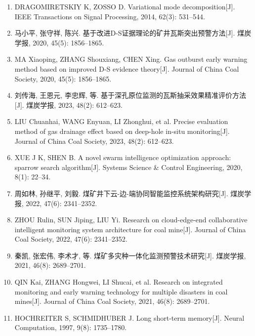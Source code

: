 \documentclass[twocolumn,a4paper]{ctexart}
\numberwithin{equation}{section}
\begin{document}
\begin{flushleft}
\songti
\begin{enumerate}
\item[{[1]}] DRAGOMIRETSKIY K, ZOSSO D. Variational mode decomposition[J]. IEEE Transactions on Signal Processing, 2014, 62(3): 531--544.

\item[{[2]}] 马小平, 张守祥, 陈兴. 基于改进D-S证据理论的矿井瓦斯突出预警方法[J]. 煤炭学报, 2020, 45(5): 1856--1865.

\item[] MA Xiaoping, ZHANG Shouxiang, CHEN Xing. Gas outburst early warning method based on improved D-S evidence theory[J]. Journal of China Coal Society, 2020, 45(5): 1856--1865.

\item[{[3]}] 刘传海, 王恩元, 李忠辉, 等. 基于深孔原位监测的瓦斯抽采效果精准评价方法[J]. 煤炭学报, 2023, 48(2): 612--623.

\item[] LIU Chuanhai, WANG Enyuan, LI Zhonghui, et al. Precise evaluation method of gas drainage effect based on deep-hole in-situ monitoring[J]. Journal of China Coal Society, 2023, 48(2): 612--623.

\item[{[4]}] XUE J K, SHEN B. A novel swarm intelligence optimization approach: sparrow search algorithm[J]. Systems Science \& Control Engineering, 2020, 8(1): 22--34.

\item[{[5]}] 周如林, 孙继平, 刘毅. 煤矿井下云-边-端协同智能监控系统架构研究[J]. 煤炭学报, 2022, 47(6): 2341--2352.

\item[] ZHOU Rulin, SUN Jiping, LIU Yi. Research on cloud-edge-end collaborative intelligent monitoring system architecture for coal mine[J]. Journal of China Coal Society, 2022, 47(6): 2341--2352.

\item[{[6]}] 秦凯, 张宏伟, 李术才, 等. 煤矿多灾种一体化监测预警技术研究[J]. 煤炭学报, 2021, 46(8): 2689--2701.

\item[] QIN Kai, ZHANG Hongwei, LI Shucai, et al. Research on integrated monitoring and early warning technology for multiple disasters in coal mines[J]. Journal of China Coal Society, 2021, 46(8): 2689--2701.

\item[{[7]}] HOCHREITER S, SCHMIDHUBER J. Long short-term memory[J]. Neural Computation, 1997, 9(8): 1735--1780.


\end{enumerate}
\end{flushleft}
\end{document}
